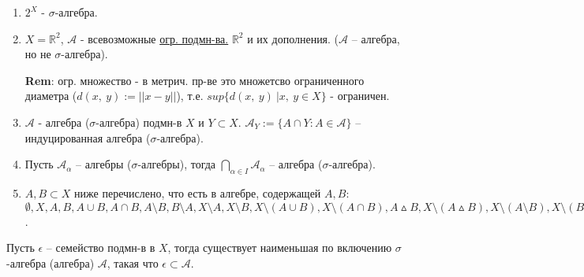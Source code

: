 \begin{example}
    \begin{enumerate}
        \item $2^X$ - $\sigma$-алгебра.
        
        \item $X = \mathbb{R}^2$, $\mathcal{A}$ - всевозможные \href{https://ru.wikipedia.org/wiki/%D0%9E%D0%B3%D1%80%D0%B0%D0%BD%D0%B8%D1%87%D0%B5%D0%BD%D0%BD%D0%BE%D1%81%D1%82%D1%8C}{огр. подмн-ва.} $\mathbb{R}^2$ и их дополнения. ($\mathcal{A}$ -- алгебра, но не $\sigma$-алгебра).
        
        \textbf{Rem}: огр. множество - в метрич. пр-ве это множетсво ограниченного диаметра ($d(x, \ y) := || x - y ||$), т.е. $sup\{ d(x, \ y) \ | x, \ y \in X \}$ - ограничен.

        \item $\mathcal{A}$ - алгебра ($\sigma$-алгебра) подмн-в $X$ и $Y \subset X$. $\mathcal{A}_{Y} := \{A \cap Y : A \in \mathcal{A}\}$ -- индуцированная алгебра ($\sigma$-алгебра).
        
        \item Пусть $\mathcal{A}_{\alpha}$ -- алгебры ($\sigma$-алгебры), тогда $\bigcap_{\alpha \in I}\mathcal{A}_{\alpha}$ -- алгебра ($\sigma$-алгебра).
        
        \item $A, B \subset X$ ниже перечислено, что есть в алгебре, содержащей $A, B$: \\ $\emptyset, X, A, B, A \cup B, A \cap B, A \setminus B, B \setminus A, X \setminus A, X \setminus B, X \setminus (A \cup B), X \setminus (A \cap B), A \vartriangle B, X \setminus (A \vartriangle B), X \setminus (A \setminus B), X \setminus (B \setminus A)$.
    \end{enumerate}
\end{example}

\begin{theorem}
    Пусть $\epsilon$ -- семейство подмн-в в $X$, тогда существует наименьшая по включению $\sigma$-алгебра (алгебра) $\mathcal{A}$, такая что $\epsilon \subset \mathcal{A}$.
\end{theorem}

